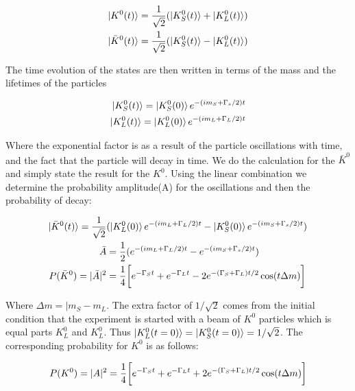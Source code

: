 \begin{align*}
\ket{K^{0}(t)} = \frac{1}{\sqrt{2}} (\ket{K^{0}_{S}(t)} + \ket{K^{0}_{L}(t)}) \\
\ket{\bar{K}^{0}(t)}= \frac{1}{\sqrt{2}} (\ket{K^{0}_{S}(t)} - \ket{K^{0}_{L}(t)})
\end{align*} 

\noindent The time evolution of the states are then written in terms of the mass and the lifetimes of the particles

\begin{align*}
\ket{K^{0}_{S}(t)} = \ket{K^{0}_{S}(0)} e^{-(im_{S}+\Gamma_{s}/2)t} \\
\ket{K^{0}_{L}(t)} = \ket{K^{0}_{L}(0)} e^{-(im_{L}+\Gamma_{L}/2)t} 
\end{align*} 

\noindent Where the exponential factor is as a result of the particle oscillations with time, and the fact that the particle will decay in time. We do the calculation for the $\bar{K}^{0}$ and simply state the result for the $K^{0}$. Using the linear combination we determine the probability amplitude(A) for the oscillations and then the probability of decay:

\begin{align*}
\ket{\bar{K}^{0}(t)} = \frac{1}{\sqrt{2}} & (\ket{K^{0}_{L}(0)} e^{-(im_{L}+\Gamma_{L}/2)t} - \ket{K^{0}_{S}(0)} e^{-(im_{S}+\Gamma_{s}/2)t}) \\
\bar{A} & = \frac{1}{2} (e^{-(im_{L}+\Gamma_{L}/2)t} - e^{-(im_{S}+\Gamma_{s}/2)t}) \\
\label{StrangenessOscillations1}
P(\bar{K}^{0}) = |\bar{A}|^{2} & = \frac{1}{4} \bigg[ e^{-\Gamma_{S}t} + e^{-\Gamma_{L}t} -2 e^{-(\Gamma_{S} + \Gamma_{L})t/2} \cos(t \Delta m )\bigg] \\
\end{align*}

\noindent Where $\Delta m = |m_{S} - m_{L}$. The extra factor of $1/{\sqrt{2}}$ comes from the initial condition that the experiment is started with a beam of $K^{0}$ particles which is equal parts $K^{0}_{L}$ and $K^{0}_{L}$. Thus $\ket{K^{0}_{L}(t=0)} = \ket{K^{0}_{S}(t=0)} = 1/{\sqrt{2}}$. The corresponding probability for $K^{0}$ is as follows:

\begin{equation*}
P({K}^{0}) = |{A}|^{2} = \frac{1}{4} \bigg[ e^{-\Gamma_{S}t} + e^{-\Gamma_{L}t} + 2 e^{-(\Gamma_{S} + \Gamma_{L})t/2} \cos(t \Delta m )\bigg] \\
\end{equation*}

